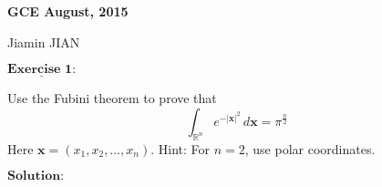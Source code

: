 \documentclass[12pt,a4paper]{ctexart}
\begin{document}
\begin{center}
\textbf{ GCE August, 2015}
\vspace{8pt}

Jiamin JIAN
\end{center}

\vspace{12pt}

$\underline{\textbf{Exercise 1:}}$

Use the Fubini theorem to prove that
\begin{equation*}
    \int_{\mathbb{R}^{n}}^{} e^{- |\textbf{x}|^{2}} \, d \textbf{x} = \pi^{\frac{n}{2}}
\end{equation*}
Here $\textbf{x} = (x_{1}, x_{2}, \dots, x_{n})$. Hint: For $n = 2$, use polar coordinates.


\vspace{8pt}

$\textbf{Solution:}$
\end{document}

